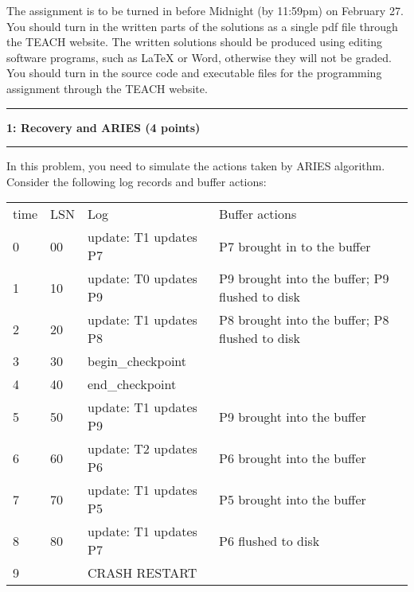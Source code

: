 \documentclass[11pt]{article}
\newcommand\question[2]{\vspace{.25in}\hrule\textbf{#1: #2}\vspace{.5em}\hrule\vspace{.10in}}
\begin{document}
\raggedright
\newcommand\NAME{Thomas Noelcke}  %
\newcommand\ANDREWID{noelcket}     %
\newcommand\HWNUM{6}              %


The assignment is to be turned in before Midnight (by 11:59pm) on February 27. 
You should turn in the written parts of the solutions as a single pdf file through the TEACH website.
The written solutions should be produced using editing software programs, such as LaTeX or Word, otherwise they will not be graded.
You should turn in the source code and executable files for the programming assignment through the TEACH website.

\question{1}{Recovery and ARIES (4 points)} 
In this problem, you need to simulate the actions taken by ARIES algorithm.
Consider the following log records and buffer actions:

\begin{table}[h!]
\begin{tabular}{ l |l |l |l |}
  time & LSN & Log & Buffer actions\\
  0 & 00 & update: T1 updates P7 & P7 brought in to the buffer \\
  1 & 10 & update: T0 updates P9 & P9 brought into the buffer; P9 flushed to disk\\
  2 & 20 & update: T1 updates P8 & P8 brought into the buffer; P8 flushed to disk \\
  3 & 30 & begin\_checkpoint &   \\
  4 &  40 & end\_checkpoint &   \\
  5 & 50 & update: T1 updates P9 &  P9 brought into the buffer \\
  6 & 60 & update: T2 updates P6 &  P6 brought into the buffer \\
  7 & 70 & update: T1 updates P5 &  P5 brought into the buffer \\
  8 & 80 & update: T1 updates P7 &  P6 flushed to disk \\
  9 & & CRASH RESTART&   \\
\end{tabular} 
\end{table}
 \vspace{-1em} 
\end{document}
